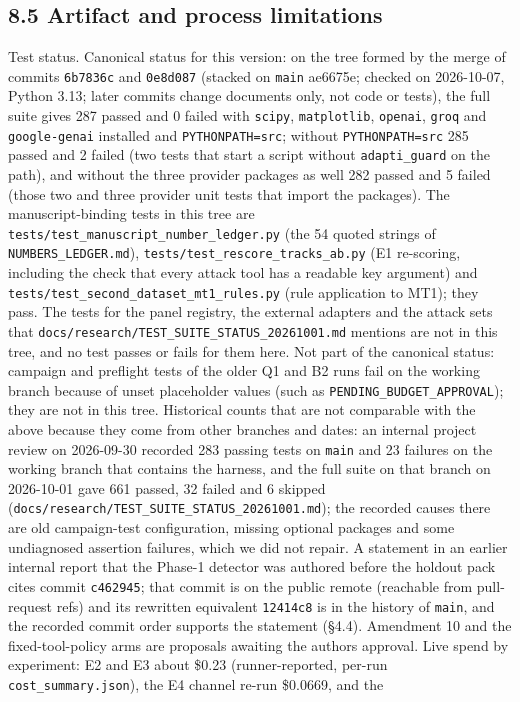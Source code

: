 \documentclass[10pt]{article}
\begin{document}
\subsection{8.5 Artifact and process limitations}

Test status. Canonical status for this version: on the tree formed by the merge of commits \texttt{6b7836c} and \texttt{0e8d087} (stacked on \texttt{main} ae6675e; checked on 2026-10-07, Python 3.13; later commits change documents only, not code or tests), the full suite gives 287 passed and 0 failed with \texttt{scipy}, \texttt{matplotlib}, \texttt{openai}, \texttt{groq} and \texttt{google-genai} installed and \texttt{PYTHONPATH=src}; without \texttt{PYTHONPATH=src} 285 passed and 2 failed (two tests that start a script without \texttt{adapti\_\allowbreak{}guard} on the path), and without the three provider packages as well 282 passed and 5 failed (those two and three provider unit tests that import the packages). The manuscript-binding tests in this tree are \texttt{tests/\allowbreak{}test\_\allowbreak{}manuscript\_\allowbreak{}number\_\allowbreak{}ledger.py} (the 54 quoted strings of \texttt{NUMBERS\_\allowbreak{}LEDGER.md}), \texttt{tests/\allowbreak{}test\_\allowbreak{}rescore\_\allowbreak{}tracks\_\allowbreak{}ab.py} (E1 re-scoring, including the check that every attack tool has a readable key argument) and \texttt{tests/\allowbreak{}test\_\allowbreak{}second\_\allowbreak{}dataset\_\allowbreak{}mt1\_\allowbreak{}rules.py} (rule application to MT1); they pass. The tests for the panel registry, the external adapters and the attack sets that \texttt{docs/\allowbreak{}research/\allowbreak{}TEST\_\allowbreak{}SUITE\_\allowbreak{}STATUS\_\allowbreak{}20261001.md} mentions are not in this tree, and no test passes or fails for them here. Not part of the canonical status: campaign and preflight tests of the older Q1 and B2 runs fail on the working branch because of unset placeholder values (such as \texttt{PENDING\_\allowbreak{}BUDGET\_\allowbreak{}APPROVAL}); they are not in this tree. Historical counts that are not comparable with the above because they come from other branches and dates: an internal project review on 2026-09-30 recorded 283 passing tests on \texttt{main} and 23 failures on the working branch that contains the harness, and the full suite on that branch on 2026-10-01 gave 661 passed, 32 failed and 6 skipped (\texttt{docs/\allowbreak{}research/\allowbreak{}TEST\_\allowbreak{}SUITE\_\allowbreak{}STATUS\_\allowbreak{}20261001.md}); the recorded causes there are old campaign-test configuration, missing optional packages and some undiagnosed assertion failures, which we did not repair. A statement in an earlier internal report that the Phase-1 detector was authored before the holdout pack cites commit \texttt{c462945}; that commit is on the public remote (reachable from pull-request refs) and its rewritten equivalent \texttt{12414c8} is in the history of \texttt{main}, and the recorded commit order supports the statement (§4.4). Amendment 10 and the fixed-tool-policy arms are proposals awaiting the authors\textquotesingle{} approval. Live spend by experiment: E2 and E3 about \$0.23 (runner-reported, per-run \texttt{cost\_\allowbreak{}summary.json}), the E4 channel re-run \$0.0669, and the 
\end{document}
